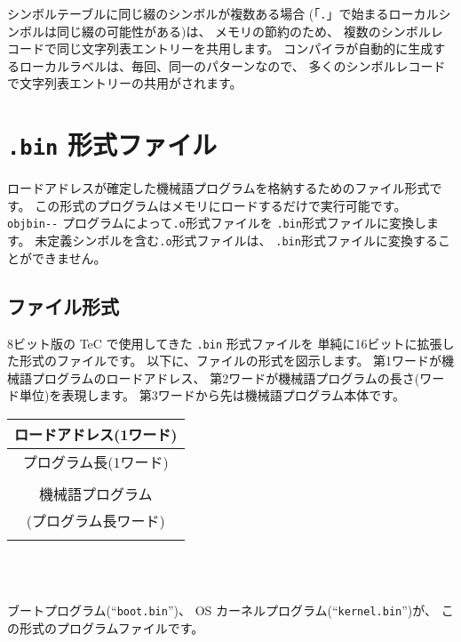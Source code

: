 シンボルテーブルに同じ綴のシンボルが複数ある場合
(「\verb/./」で始まるローカルシンボルは同じ綴の可能性がある)は、
メモリの節約のため、
複数のシンボルレコードで同じ文字列表エントリーを共用します。
\cmm コンパイラが自動的に生成するローカルラベルは、毎回、同一のパターンなので、
多くのシンボルレコードで文字列表エントリーの共用がされます。

\section{{\tt .bin} 形式ファイル}
\label{app:bformat}

ロードアドレスが確定した機械語プログラムを格納するためのファイル形式です。
この形式のプログラムはメモリにロードするだけで実行可能です。
\verb/objbin--/ プログラムによって{\tt .o}形式ファイルを
{\tt .bin}形式ファイルに変換します。
未定義シンボルを含む{\tt .o}形式ファイルは、
{\tt .bin}形式ファイルに変換することができません。

\subsection{ファイル形式}

8ビット版の TeC で使用してきた {\tt .bin} 形式ファイルを
単純に16ビットに拡張した形式のファイルです。
以下に、ファイルの形式を図示します。
第1ワードが機械語プログラムのロードアドレス、
第2ワードが機械語プログラムの長さ(ワード単位)を表現します。
第3ワードから先は機械語プログラム本体です。

\begin{myminipage}
\begin{tabular}{|c|}
\hline
ロードアドレス(1ワード) \\
\hline
プログラム長(1ワード) \\
\hline
\\
機械語プログラム \\
(プログラム長ワード)\\
\\
\hline
\end{tabular}
\\ \\
\end{myminipage}

ブートプログラム(``{\tt boot.bin}'')、
OS カーネルプログラム(``{\tt kernel.bin}'')が、
この形式のプログラムファイルです。
